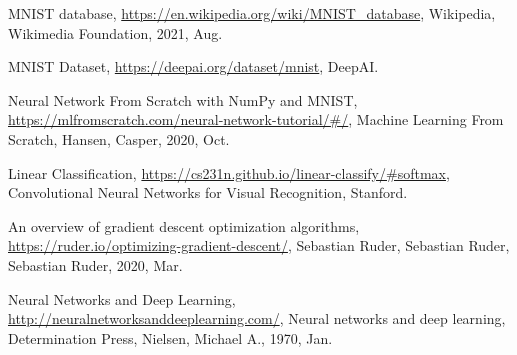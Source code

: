 \documentclass[12pt]{report}
\begin{document}
\begin{thebibliography}{9}

    MNIST database,
    \url{https://en.wikipedia.org/wiki/MNIST\_database},
    Wikipedia, 
    Wikimedia Foundation,
    2021,
    Aug.

    MNIST Dataset, 
    \url{https://deepai.org/dataset/mnist}, 
    DeepAI.

    Neural Network From Scratch with NumPy and MNIST, 
    \url{https://mlfromscratch.com/neural-network-tutorial/\#/},
    Machine Learning From Scratch,
    Hansen, Casper,
    2020,
    Oct.

    Linear Classification, 
    \url{https://cs231n.github.io/linear-classify/\#softmax}, 
    Convolutional Neural Networks for Visual Recognition, 
    Stanford.

    An overview of gradient descent optimization algorithms,
    \url{https://ruder.io/optimizing-gradient-descent/}, 
    Sebastian Ruder, Sebastian Ruder, 
    Sebastian Ruder, 
    2020, 
    Mar.

    Neural Networks and Deep Learning, 
    \url{http://neuralnetworksanddeeplearning.com/}, 
    Neural networks and deep learning, 
    Determination Press, 
    Nielsen, Michael A., 
    1970, 
    Jan.



\end{thebibliography}
\end{document}
